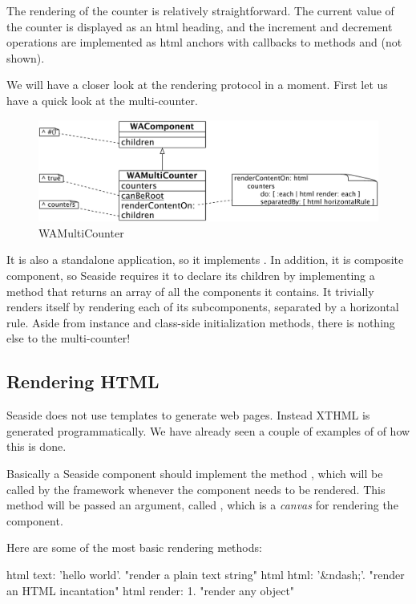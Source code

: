 \documentclass[a4paper,10pt,twoside]{book}
\begin{document}
The rendering of the counter is relatively straightforward.
The current value of the counter is displayed as an html heading, and the increment and decrement operations are implemented as html anchors with callbacks to methods  and  (not shown).

We will have a closer look at the rendering protocol in a moment.
First let us have a quick look at the multi-counter.

\begin{figure}[ht]
\begin{center}
\includegraphics[width=\textwidth]{WAMultiCounter}
\caption{WAMultiCounter}
\label{fig:WAMultiCounter}
\end{center}
\end{figure}

It is also a standalone application, so it implements .
In addition, it is composite component, so Seaside requires it to declare its children by implementing a method  that returns an array of all the components it contains.
It trivially renders itself by rendering each of its subcomponents, separated by a horizontal rule.
Aside from instance and class-side initialization methods, there is nothing else to the multi-counter!

\subsection{Rendering HTML}

Seaside does not use templates to generate web pages.
Instead XTHML is generated programmatically.
We have already seen a couple of examples of of how this is done.

Basically a Seaside component should implement the method , which will be called by the framework whenever the component needs to be rendered.
This method will be passed an argument, called , which is a \emph{canvas} for rendering the component.

Here are some of the most basic rendering methods:
\begin{code}{}
html text: 'hello world'.  "render a plain text string"
html html: '&ndash;'.     "render an HTML incantation"
html render: 1.              "render any object"
\end{code}
\end{document}

